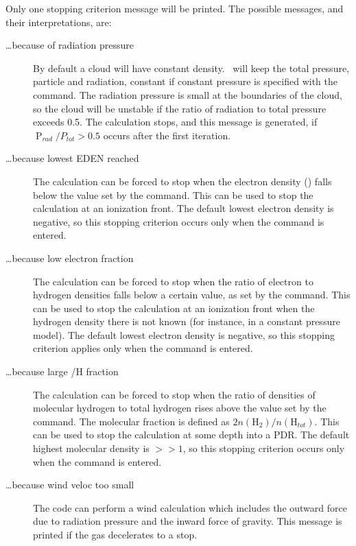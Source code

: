 Only one stopping criterion message will be printed.
The possible
messages, and their interpretations, are:
\begin{description}
\item[ \dots because of radiation pressure]  By default a cloud will have constant
density.  \Cloudy\ will keep the total pressure, particle and radiation,
constant if constant pressure is specified with the 
command.  The radiation pressure is small at the boundaries of the cloud,
so the cloud will be unstable if the ratio of radiation to total pressure
exceeds 0.5.  The calculation stops, and this message is generated, if
${{\mathop{\mathrm P}\nolimits} _{rad}}/{P_{tot}} > 0.5$
    occurs after the first iteration.

\item[\dots because lowest EDEN reached]  The calculation can be forced to stop
when the electron density () falls below the value set by the
command.  This can be used to stop the calculation at an ionization front.
The default lowest electron density is negative, so this stopping criterion
occurs only when the command is entered.

\item[\dots because low electron fraction]  The calculation can be forced to
stop when the ratio of electron to hydrogen densities falls below a certain
value, as set by the  command.  This can be used to stop the
calculation at an ionization front when the hydrogen density there is not
known (for instance, in a constant pressure model).  The default lowest
electron density is negative, so this stopping criterion applies only when
the command is entered.

\item[\dots because large \htwo/H fraction]  The calculation can be forced
to stop when the ratio of densities of molecular hydrogen to total hydrogen
rises above the value set by the  command.  The molecular fraction
is defined as $2n(\mathrm{H}_2)/n(\mathrm{H}_{tot})$.  This can be used to stop the calculation
at some depth into a PDR.  The default highest molecular density is $>> 1$,
so this stopping criterion occurs only when the  command is
entered.

\item[\dots because wind veloc too small]  The code can perform a wind calculation
which includes the outward force due to radiation pressure and the inward
force of gravity.  This message is printed if the gas decelerates to a stop.


\end{description}
